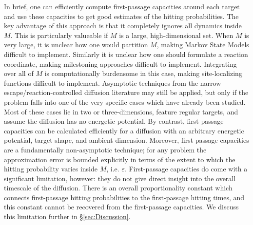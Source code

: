\documentclass[12pt, nofootinbib,english, amsmath, amssymb, aps, priprint, graphicx,floatfix]{revtex4-1}
\theoremstyle{plain}
\theoremstyle{definition}
\theoremstyle{plain}
\begin{document}
In brief, one can efficiently compute first-passage capacities around each target and use these capacities to get good estimates of the hitting probabilities.  The key advantage of this approach is that it completely ignores all dynamics inside $M$.  This is particularly valueable if $M$ is a large, high-dimensional set.  When $M$ is very large, it is unclear how one would partition $M$, making Markov State Models difficult to implement.  Similarly it is unclear how one should formulate a reaction coordinate, making milestoning approaches difficult to implement.  Integrating over all of $M$ is computationally burdensome in this case, making site-localizing functions difficult to implement.  Asymptotic techniques from the narrow escape/reaction-controlled diffusion literature may still be applied, but only if the problem falls into one of the very specific cases which have already been studied.  Most of these cases lie in two or three-dimensions, feature regular targets, and assume the diffusion has no energetic potential.  By contrast, first passage capacities can be calculated efficiently for a diffusion with an arbitrary energetic potential, target shape, and ambient dimension.  Moreover, first-passage capacities are a fundamentally non-asymptotic technique; for any problem the approximation error is bounded explicitly in terms of the extent to which the hitting probability varies inside $M$, i.e. $\varepsilon$.   First-passage capacities do come with a significant limitation, however: they do not give direct insight into the overall timescale of the diffusion. There is an overall proportionality constant which connects first-passage hitting probabilities to the first-passage hitting times, and this constant cannot be recovered from the first-passage capacities.  We discuss this limitation further in \S\ref{sec:Discussion}.
\end{document}
